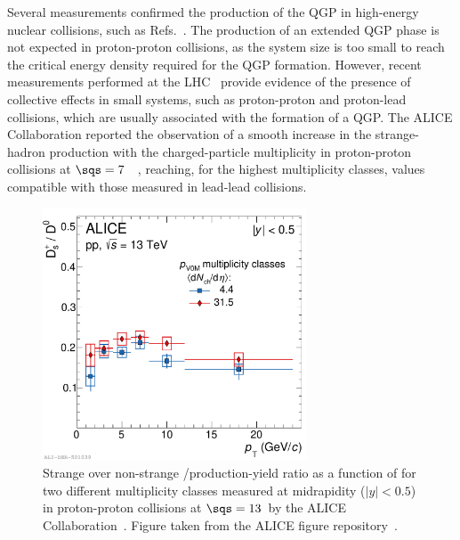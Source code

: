 Several measurements confirmed the production of the QGP in high-energy nuclear collisions, such as Refs.~\cite{NA50:1997hlx,WA97:2000apo,ALICE:2018vuu}. The production of an extended QGP phase is not expected in proton-proton collisions, as the system size is too small to reach the critical energy density required for the QGP formation. However, recent measurements performed at the LHC~\cite{CMS:2016fnw,CMS:2010ifv,ALICE:2019zfl} provide evidence of the presence of collective effects in small systems, such as proton-proton and proton-lead collisions, which are usually associated with the formation of a QGP. The ALICE Collaboration reported the observation of a smooth increase in the strange-hadron production with the charged-particle multiplicity in proton-proton collisions at $\sqs=7$~\tev~\cite{ALICE:2016fzo}, reaching, for the highest multiplicity classes, values compatible with those measured in lead-lead collisions. 

\begin{figure}[tb]
    \centering
    \includegraphics[width=0.7\textwidth]{Figures/Chapter 9/DsD0Ratios_LowHighMult_V0M_Derived.pdf}
    \caption{Strange over non-strange \ds/\dz production-yield ratio as a function of \pt for two different multiplicity classes measured at midrapidity ($\lvert y\rvert<0.5$) in proton-proton collisions at $\sqs=13$~\tev by the ALICE Collaboration~\cite{ALICE:2021npz}. Figure taken from the ALICE figure repository~\cite{ALICE_figures}.}
    \label{fig:ALICE_DsD0VsMultiplicity}
\end{figure}

